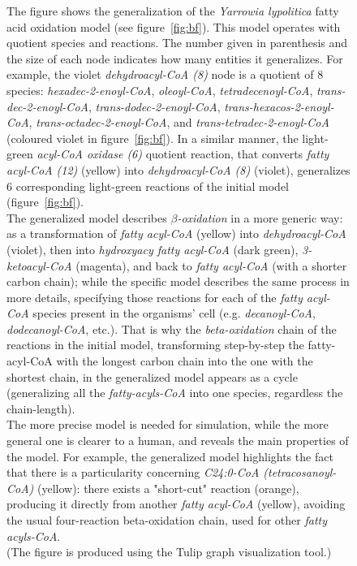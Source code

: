 \documentclass[9pt]{article}
\newcounter{fig}
\newcounter{rm}
\begin{document}
\begin{figure}
\captionsetup{labelformat=adja-page}
\ContinuedFloat
    \caption{The figure shows the generalization of the \textit{Yarrowia lypolitica} fatty acid oxidation model (see figure~\ref{fig:bf}). This model operates with quotient species and reactions. The number given in parenthesis and the size of each node indicates how many entities it generalizes. For example, the violet \textit{dehydroacyl-CoA (8)} node is a quotient of 8 species: \textit{hexadec-2-enoyl-CoA}, \textit{oleoyl-CoA}, \textit{tetradecenoyl-CoA}, \textit{trans-dec-2-enoyl-CoA}, \textit{trans-dodec-2-enoyl-CoA}, \textit{trans-hexacos-2-enoyl-CoA}, \textit{trans-octadec-2-enoyl-CoA}, and \textit{trans-tetradec-2-enoyl-CoA} (coloured violet in figure~\ref{fig:bf}). In a similar manner, the light-green \textit{acyl-CoA oxidase (6)} quotient reaction, that converts \textit{fatty acyl-CoA (12)} (yellow) into \textit{dehydroacyl-CoA (8)} (violet), generalizes 6 corresponding light-green reactions of the initial model (figure~\ref{fig:bf}).\\      
      The generalized model describes \textit{$\beta$-oxidation} in a more generic way: as a transformation of \textit{fatty acyl-CoA} (yellow) into \textit{dehydroacyl-CoA} (violet), then into \textit{hydroxyacy fatty acyl-CoA} (dark green), \textit{3-ketoacyl-CoA} (magenta), and back to \textit{fatty acyl-CoA} (with a shorter carbon chain); while the specific model describes the same process in more details, specifying those reactions for each of the \textit{fatty acyl-CoA} species present in the organisms' cell (e.g. \textit{decanoyl-CoA}, \textit{dodecanoyl-CoA}, etc.). That is why the \textit{beta-oxidation} chain of the reactions in the initial model, transforming step-by-step the fatty-acyl-CoA with the longest carbon chain into the one with the shortest chain, in the generalized model appears as a cycle (generalizing all the \textit{fatty-acyls-CoA} into one species, regardless the chain-length).\\      
      The more precise model is needed for simulation, while the more general one is clearer to a human, and reveals the main properties of the model. For example, the generalized model highlights the fact that there is a particularity concerning \textit{C24:0-CoA (tetracosanoyl-CoA)} (yellow): there exists a "short-cut" reaction (orange), producing it directly from another \textit{fatty acyl-CoA} (yellow), avoiding the usual four-reaction beta-oxidation chain, used for other \textit{fatty acyls-CoA}.\\      
      (The figure is produced using the Tulip graph visualization tool.)}
\label{fig:yali}
\end{figure}
\end{document}
